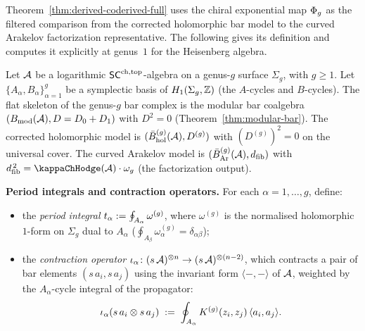 Theorem~\ref{thm:derived-coderived-full} uses the chiral
exponential map $\Phi_g$ as the filtered comparison from the
corrected holomorphic bar model to the curved Arakelov
factorization representative. The following gives its definition
and computes it explicitly at genus~$1$ for the Heisenberg algebra.

\begin{construction}
\label{constr:chiral-exponential}
Let $\mathcal{A}$ be a logarithmic $\mathsf{SC}^{\mathrm{ch,top}}$-algebra on a genus-$g$
surface $\Sigma_g$, with $g \ge 1$. Let
$\{A_\alpha, B_\alpha\}_{\alpha=1}^{g}$ be a symplectic basis
of $H_1(\Sigma_g, \mathbb{Z})$ (the $A$-cycles and $B$-cycles).
The flat skeleton of the genus-$g$ bar complex is the modular
bar coalgebra $(B_{\mathrm{mod}}(\mathcal{A}), D = D_0 + D_1)$ with $D^2 = 0$
(Theorem~\ref{thm:modular-bar}). The corrected holomorphic model
is $(\bar{B}_{\mathrm{hol}}^{(g)}(\mathcal{A}),D^{(g)})$ with
$(D^{(g)})^2=0$ on the universal cover. The curved Arakelov model
is $(\bar{B}_{\mathrm{Ar}}^{(g)}(\mathcal{A}), d_{\mathrm{fib}})$ with
$\dfib^{\,2} = \kappaChHodge(\cA)\cdot \omega_g$ (the factorization
output).

\smallskip\noindent
\textbf{Period integrals and contraction operators.}
For each $\alpha = 1, \ldots, g$, define:
\begin{itemize}
\item the \emph{period integral}
 $t_\alpha := \oint_{A_\alpha} \omega^{(g)}$, where
 $\omega^{(g)}$ is the normalised holomorphic $1$-form on
 $\Sigma_g$ dual to $A_\alpha$
 ($\oint_{A_\beta} \omega^{(g)}_\alpha = \delta_{\alpha\beta}$);
\item the \emph{contraction operator}
 $\iota_\alpha \colon (s\,\mathcal{A})^{\otimes n} \to
 (s\,\mathcal{A})^{\otimes (n-2)}$, which contracts a pair of
 bar elements $(s\,a_i, s\,a_j)$ using the invariant form
 $\langle -, - \rangle$ of $\mathcal{A}$, weighted by the
 $A_\alpha$-cycle integral of the propagator:
 \[
 \iota_\alpha(s\,a_i \otimes s\,a_j)
 \;:=\;
 \oint_{A_\alpha}
 K^{(g)}(z_i, z_j)\,
 \langle a_i, a_j \rangle.
 \]
\end{itemize}


\end{construction}
